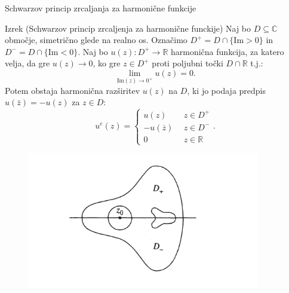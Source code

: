\documentclass{beamer}
\newcommand{\C}{\mathbb C}
\theoremstyle{definition}
\theoremstyle{definition}
\begin{document}
\begin{frame}{Schwarzov princip zrcaljanja za harmonične funkcije}
   \begin{exampleblock}{Izrek (Schwarzov princip zrcaljenja za harmonične funckije)}
      Naj bo $D \subseteq \C$ območje, simetrično glede na realno os. 
      Označimo $D^{+} = D \cap \{\text{Im} > 0\}$ in $D^{-} = D \cap \{\text{Im} < 0\}$.
      \newline
      Naj bo $u(z): D^{+} \to \mathbb{R}$ harmonična funkcija, za katero velja, da gre $u(z) \to 0$, ko gre $z \in D^{+}$ proti poljubni točki $D \cap \mathbb{R}$ t.j.: $$\lim_{\text{Im}(z) \to 0^+} u(z) = 0.$$
      Potem obstaja harmonična razširitev $u(z)$ na $D$, ki jo podaja predpis $u(\bar{z}) = - u(z)$ za $z \in D$:
      $$
          u^e(z) = 
          \begin{cases}
              u(z)~~&z \in D^{+}\\
              -u(\overline{z})~~&z \in D^{-}\\
              0~~ &z \in \mathbb{R}
          \end{cases}
          .
      $$
   \end{exampleblock}
\end{frame}
\begin{frame}
   \begin{figure}
   \begin{center}
      \includegraphics[width=0.90\textwidth]{schwarzov_princip_zrcaljenja.png}
   \end{center}
\end{figure}
\end{frame}

\end{document}
